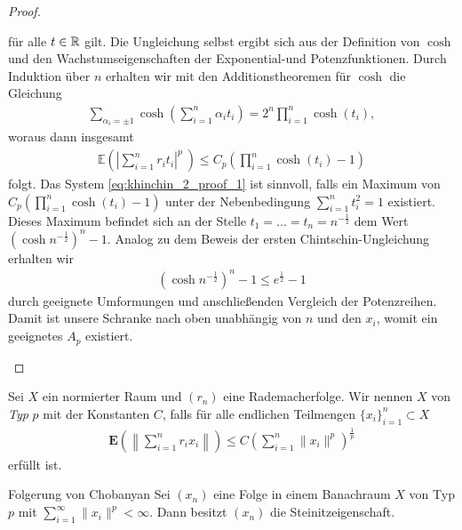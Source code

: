 \begin{proof}
\begin{description}
		für alle $ t \in \mathbb{R} $ gilt. Die Ungleichung selbst ergibt sich aus der Definition von $ \cosh  $ und den Wachstumseigenschaften der Exponential-und Potenzfunktionen.\newpage
		Durch Induktion über $ n $ erhalten wir mit den Additionstheoremen für $ \cosh $ die Gleichung
		\begin{align*}
			\sum \limits_{\alpha_i = \pm 1} 
			\cosh
			\left(
			\sum \limits_{i = 1}^n \alpha_it_i
			\right)
			=
			2^n 
			\prod \limits_{i = 1}^n \cosh(t_i),
		\end{align*}
		woraus dann insgesamt
		\begin{align*}
			\mathbb{E} 
			\left(
			\left|
			\sum\limits_{i = 1}^n r_i t_i
			\right|^p \
			\right)
			\leq 
			C_p
			\left( \prod \limits_{i = 1}^n \cosh(t_i) - 1\right)
		\end{align*}
		folgt.
		Das System \eqref{eq:khinchin_2_proof_1} ist sinnvoll, falls ein Maximum von $ 	C_p
		\left( \prod_{i = 1}^n \cosh(t_i) - 1\right) $ unter der Nebenbedingung $ \sum_{i = 1}^n t_i^2 = 1 $ existiert.
		Dieses Maximum befindet sich an der Stelle $ t_1 = ... = t_n = n^{- \frac{1}{2}} $ dem Wert $ (\cosh n^{- \frac{1}{2}} )^n - 1 $. 
		Analog zu dem Beweis der ersten Chintschin-Ungleichung erhalten wir
		\begin{align*}
			\left(\cosh n^{- \frac{1}{2}} \right)^n - 1 \leq e^{\frac{1}{2}} - 1
		\end{align*}
		durch geeignete Umformungen und anschließenden Vergleich der Potenzreihen.
		Damit ist unsere Schranke nach oben unabhängig von $ n $ und den $ x_i $, womit ein geeignetes $ A_p  $ existiert. 
	\end{description}
	
	
	
\end{proof}



\begin{df}
	Sei $ X $ ein normierter Raum und $ (r_n) $ eine Rademacherfolge.
	Wir nennen $ X $ von \textit{Typ} $ p $ mit der Konstanten $ C $, falls für alle endlichen Teilmengen $ \{x_i \}_{i=1}^n \subset X $
	\begin{align}
		\mathbf{E}
		\left(
		\left\|
		\sum  \limits_{i = 1}^n r_i x_i
		\right\|
		\right)
		\leq 
		C 
		\left(
		\sum  \limits_{i = 1}^n \|x_i\|^p
		\right)^{\frac{1}{p}}
	\end{align}
	erfüllt ist.
\end{df}

\begin{genericthm}{Folgerung von Chobanyan}\label{th:conclusion_chobanyan}
	Sei $ (x_n) $ eine Folge in einem Banachraum $ X $ von Typ $ p $ mit $ \sum_{i=1}^\infty \|x_i \|^p < \infty $.
	Dann besitzt $ (x_n) $ die Steinitzeigenschaft.
\end{genericthm}

